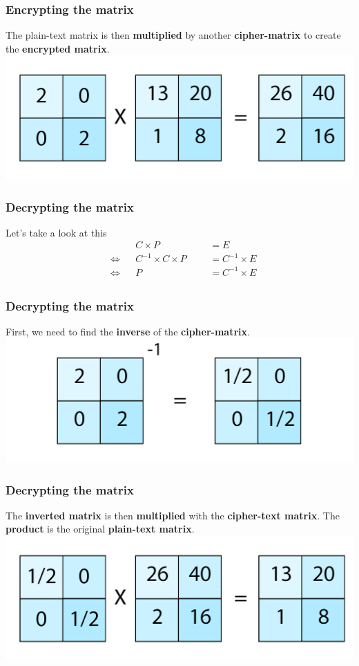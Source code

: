 \documentclass[11pt]{beamer}
\begin{document}
\begin{frame}\frametitle{Encrypting the matrix}

The plain-text matrix is then \textbf{multiplied} by another \textbf{cipher-matrix} to create the \textbf{encrypted matrix}.
\center \includegraphics[scale=0.2]{multiply_1.png}

\end{frame}

\begin{frame}\frametitle{Decrypting the matrix}
	\center Let's take a look at this
	\begin{align*}
		& &&C \times P &&&= E\\
		&\iff &&C^{-1} \times C \times P &&&= C^{-1} \times E\\
		&\iff &&P &&&= C^{-1} \times E\\
	\end{align*}
\end{frame}

\begin{frame}\frametitle{Decrypting the matrix}

First, we need to find the \textbf{inverse} of the \textbf{cipher-matrix}.\\[10mm]
\center \includegraphics[scale=0.2]{inverse_1.png}
\end{frame}

\begin{frame}\frametitle{Decrypting the matrix}

The \textbf{inverted matrix} is then \textbf{multiplied} with the \textbf{cipher-text matrix}.
The \textbf{product} is the original \textbf{plain-text matrix}.
\center \includegraphics[scale=0.2]{multiply_2.png}
\end{frame}
\end{document}
